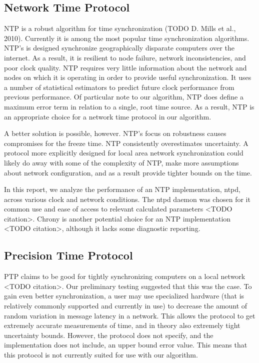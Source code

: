 \subsection{Network Time Protocol}

NTP is a robust algorithm for time synchronization (TODO D. Mills et
al., 2010). Currently it is among the most popular time
synchronization algorithms. NTP’s is designed synchronize
geographically disparate computers over the internet. As a result, it
is resilient to node failure, network inconsistencies, and poor clock
quality. NTP requires very little information about the network and
nodes on which it is operating in order to provide useful
synchronization. It uses a number of statistical estimators to predict
future clock performance from previous performance. Of particular note
to our algorithm, NTP does define a maximum error term in relation to
a single, root time source. As a result, NTP is an appropriate choice
for a network time protocol in our algorithm.

A better solution is possible, however. NTP’s focus on robustness
causes compromises for the freeze time. NTP consistently overestimates
uncertainty. A protocol more explicitly designed for local area
network synchronization could likely do away with some of the
complexity of NTP, make more assumptions about network configuration,
and as a result provide tighter bounds on the time.

In this report, we analyze the performance of an NTP implementation,
ntpd, across various clock and network conditions. The ntpd daemon was
chosen for it common use and ease of access to relevant calculated
parameters <TODO citation>. Chrony is another potential choice for an NTP
implementation <TODO citation>, although it lacks some diagnostic
reporting.

\subsection{Precision Time Protocol}

PTP claims to be good for tightly synchronizing computers on a local
network <TODO citation>. Our preliminary testing suggested that this was
the case. To gain even better synchronization, a user may use
specialized hardware (that is relatively commonly supported and
currently in use) to decrease the amount of random variation in
message latency in a network. This allows the protocol to get
extremely accurate measurements of time, and in theory also extremely
tight uncertainty bounds. However, the protocol does not specify, and
the implementation does not include, an upper bound error value. This
means that this protocol is not currently suited for use with our
algorithm.

